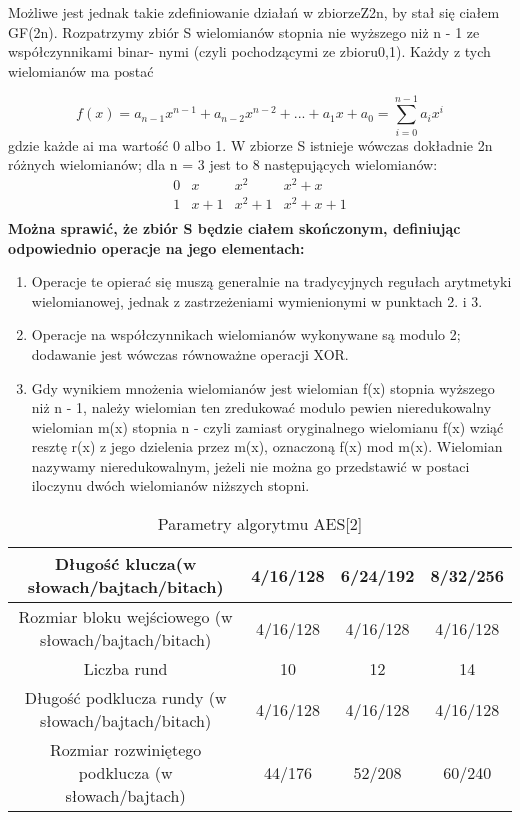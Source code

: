 \documentclass[12pt, letterpaper, titlepage]{article}
\begin{document}
\noindent Możliwe jest jednak takie zdefiniowanie działań w zbiorzeZ2n, by stał się ciałem GF(2n).
Rozpatrzymy zbiór S wielomianów stopnia nie wyższego niż n - 1 ze współczynnikami binar-
nymi (czyli pochodzącymi ze zbioru{0,1}). Każdy z tych wielomianów ma postać

$$f(x)=a_{n-1}x^{n-1}+a_{n-2}x^{n-2}+...+a_{1}x+a_{0}= \sum_{i=0}^{n-1} a_{i}x^{i} $$
gdzie każde ai ma wartość 0 albo 1. W zbiorze S istnieje wówczas dokładnie 2n różnych
wielomianów; dla n = 3 jest to 8 następujących wielomianów:
$$
\begin{array}{cccc}
0 & x & x^{2} & x^{2}+x \\
1 & x+1 & x^{2}+1 & x^{2}+x+1 \\
\end{array}
$$ 
\newpage
\noindent \textbf{Można sprawić, że zbiór S będzie ciałem skończonym, definiując odpowiednio operacje na
jego elementach:}
\newline
\begin{enumerate}
\item  Operacje te opierać się muszą generalnie na tradycyjnych regułach arytmetyki wielomianowej, jednak z zastrzeżeniami wymienionymi w punktach 2. i 3.
\item Operacje na współczynnikach wielomianów wykonywane są modulo 2; dodawanie jest
wówczas równoważne operacji XOR.
\item Gdy wynikiem mnożenia wielomianów jest wielomian f(x) stopnia wyższego niż n -
1, należy wielomian ten zredukować modulo pewien nieredukowalny wielomian m(x)
stopnia n - czyli zamiast oryginalnego wielomianu f(x) wziąć resztę r(x) z jego dzielenia
przez m(x), oznaczoną f(x) mod m(x). Wielomian nazywamy nieredukowalnym, jeżeli
nie można go przedstawić w postaci iloczynu dwóch wielomianów niższych stopni.
\end{enumerate}
\begin{table}[h]
\centering\caption{Parametry algorytmu AES[2]}\label{tabela 1}
\begin{tabular}{|c|c|c|c|}
\hline
Długość klucza(w słowach/bajtach/bitach) & 4/16/128 & 6/24/192 & 8/32/256 \\
\hline
Rozmiar bloku wejściowego (w słowach/bajtach/bitach) & 4/16/128 & 4/16/128 & 4/16/128 \\
\hline
Liczba rund & 10 & 12 & 14 \\
\hline
Długość podklucza rundy (w słowach/bajtach/bitach) & 4/16/128 & 4/16/128 & 4/16/128 \\
\hline
Rozmiar rozwiniętego podklucza (w słowach/bajtach) & 44/176 & 52/208 & 60/240\\
\hline
\end{tabular}
\end{table}
\newpage
\end{document}
